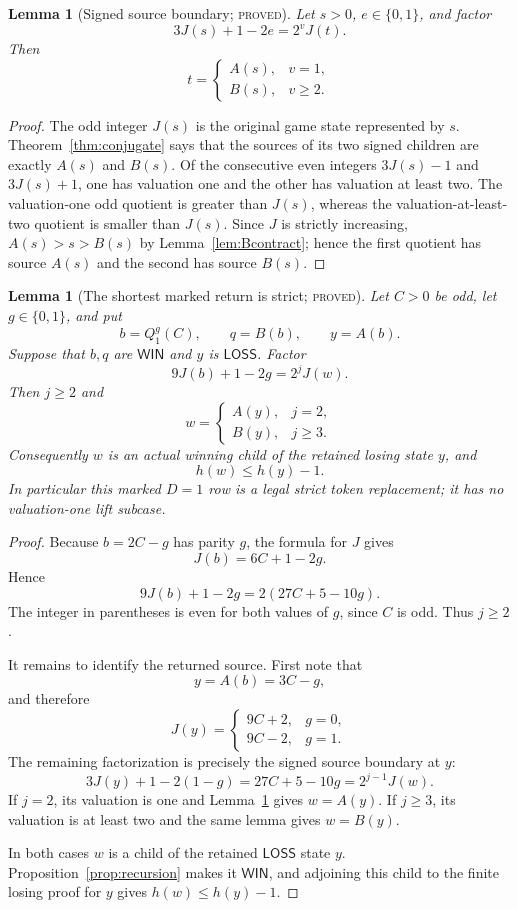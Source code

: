 \documentclass[11pt]{article}
\newtheorem{lemma}[theorem]{Lemma}
\theoremstyle{definition}
\newcommand{\Win}{\mathsf{WIN}}
\newcommand{\Loss}{\mathsf{LOSS}}
\newcommand{\proved}{\textsc{proved}}
\begin{document}
\begin{lemma}[Signed source boundary; \proved]
\label{lem:signed-source-boundary}
Let $s>0$, $e\in\{0,1\}$, and factor
\[
 3J(s)+1-2e=2^vJ(t).
\]
Then
\[
 t=\begin{cases}
 A(s),&v=1,\\
 B(s),&v\ge2.
 \end{cases}
\]
\end{lemma}

\begin{proof}
The odd integer $J(s)$ is the original game state represented by $s$.
Theorem~\ref{thm:conjugate} says that the sources of its two signed children
are exactly $A(s)$ and $B(s)$.  Of the consecutive even integers
$3J(s)-1$ and $3J(s)+1$, one has valuation one and the other has valuation at
least two.  The valuation-one odd quotient is greater than $J(s)$, whereas
the valuation-at-least-two quotient is smaller than $J(s)$.  Since $J$ is
strictly increasing, $A(s)>s>B(s)$ by Lemma~\ref{lem:Bcontract}; hence the
first quotient has source $A(s)$ and the second has source $B(s)$.
\end{proof}

\begin{lemma}[The shortest marked return is strict; \proved]
\label{lem:shortest-marked-return}
Let $C>0$ be odd, let $g\in\{0,1\}$, and put
\[
 b=Q_1^g(C),\qquad q=B(b),\qquad y=A(b).
\]
Suppose that $b,q$ are $\Win$ and $y$ is $\Loss$.  Factor
\[
 9J(b)+1-2g=2^jJ(w).
\]
Then $j\ge2$ and
\[
 w=\begin{cases}
 A(y),&j=2,\\
 B(y),&j\ge3.
 \end{cases}
\]
Consequently $w$ is an actual winning child of the retained losing state
$y$, and
\[
 h(w)\le h(y)-1.
\]
In particular this marked $D=1$ row is a legal strict token replacement; it
has no valuation-one lift subcase.
\end{lemma}

\begin{proof}
Because $b=2C-g$ has parity $g$, the formula for $J$ gives
\[
 J(b)=6C+1-2g.
\]
Hence
\[
 9J(b)+1-2g=2(27C+5-10g).
\]
The integer in parentheses is even for both values of $g$, since $C$ is odd.
Thus $j\ge2$.

It remains to identify the returned source.  First note that
\[
 y=A(b)=3C-g,
\]
and therefore
\[
 J(y)=\begin{cases}
 9C+2,&g=0,\\
 9C-2,&g=1.
 \end{cases}
\]
The remaining factorization is precisely the signed source boundary at $y$:
\[
 3J(y)+1-2(1-g)=27C+5-10g=2^{j-1}J(w).
\]
If $j=2$, its valuation is one and
Lemma~\ref{lem:signed-source-boundary} gives $w=A(y)$.  If $j\ge3$, its
valuation is at least two and the same lemma gives $w=B(y)$.

In both cases $w$ is a child of the retained $\Loss$ state $y$.
Proposition~\ref{prop:recursion} makes it $\Win$, and adjoining this child to
the finite losing proof for $y$ gives $h(w)\le h(y)-1$.
\end{proof}
\end{document}
